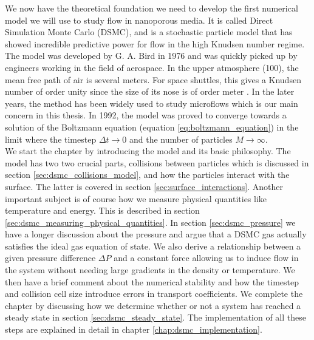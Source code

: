 We now have the theoretical foundation we need to develop the first numerical model we will use to study flow in nanoporous media. It is called Direct Simulation Monte Carlo (DSMC), and is a stochastic particle model that has showed incredible predictive power for flow in the high Knudsen number regime. The model was developed by G. A. Bird in 1976 and was quickly picked up by engineers working in the field of aerospace. In the upper atmosphere (\unit{100}{\kilo\meter}), the mean free path of air is several meters. For space shuttles, this gives a Knudsen number of order unity since the size of its nose is of order meter \cite{alexander1997direct}. In the later years, the method has been widely used to study microflows which is our main concern in this thesis. In 1992, the model was proved to converge towards a solution of the Boltzmann equation (equation \eqref{eq:boltzmann_equation}) in the limit where the timestep $\Delta t\rightarrow 0$ and the number of particles $M\rightarrow \infty$.\\
We start the chapter by introducing the model and its basic philosophy. The model has two two crucial parts, collisions between particles which is discussed in section \ref{sec:dsmc_collisions_model}, and how the particles interact with the surface. The latter is covered in section \ref{sec:surface_interactions}. Another important subject is of course how we measure physical quantities like temperature and energy. This is described in section \ref{sec:dsmc_measuring_physical_quantities}. In section \ref{sec:dsmc_pressure} we have a longer discussion about the pressure and argue that a DSMC gas actually satisfies the ideal gas equation of state. We also derive a relationship between a given pressure difference $\Delta P$ and a constant force allowing us to induce flow in the system without needing large gradients in the density or temperature. We then have a brief comment about the numerical stability and how the timestep and collision cell size introduce errors in transport coefficients. We complete the chapter by discussing how we determine whether or not a system has reached a steady state in section \ref{sec:dsmc_steady_state}. The implementation of all these steps are explained in detail in chapter \ref{chap:dsmc_implementation}.